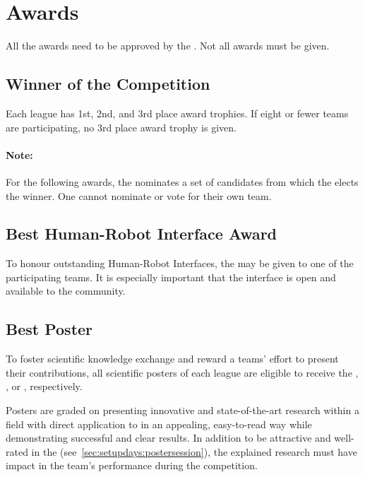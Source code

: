\section{Awards}
\label{sec:introduction:awards}
All the awards need to be approved by the \RCF{}. Not all awards must be given.


\subsection{Winner of the Competition}
\label{sec:introduction:winner}
Each league has 1st, 2nd, and 3rd place award trophies. If eight or fewer teams are participating, no 3rd place award trophy is given.

\newpage
\paragraph*{Note: } For the following awards, the \EC{} nominates a set of candidates from which the \TC{} elects the winner. One cannot nominate or vote for their own team.

\subsection{Best Human-Robot Interface Award}
\label{sec:introduction:hriaward}
To honour outstanding Human-Robot Interfaces, the \HRIAward{} may be given to one of the participating teams. It is especially important that the interface is open and available to the \AtHome{} community.

\subsection{Best Poster}
\label{sec:introduction:bestposter}
To foster scientific knowledge exchange and reward a teams' effort to present their contributions, all scientific posters of each league are eligible to receive the \DSPLPosterAward, \SSPLPosterAward, or \OPLPosterAward, respectively.

Posters are graded on presenting innovative and state-of-the-art research within a field with direct application to \RoboCup\AtHome{} in an appealing, easy-to-read way while demonstrating successful and clear results. In addition to be attractive and well-rated in the \PS{} (see~\ref{sec:setupdays:postersession}), the explained research must have impact in the team's performance during the competition.

